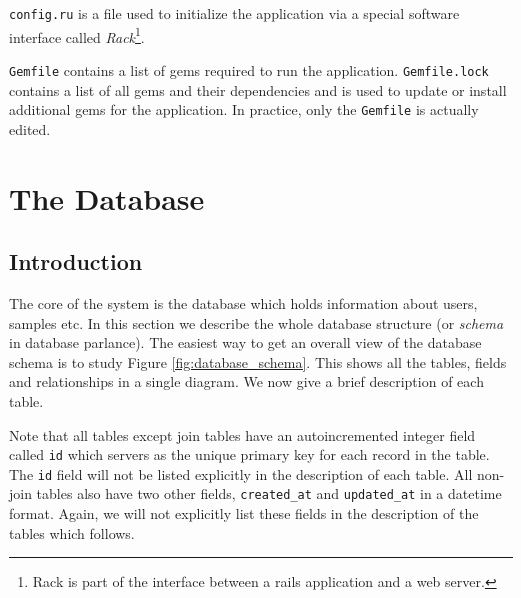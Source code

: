 \documentclass[12pt,twoside]{article}
\begin{document}
\verb=config.ru= is a file used to initialize the application via a
special software interface called \emph{Rack}\footnote{Rack is part
of the interface between a rails application and a web server.}.

\verb=Gemfile= contains a list of gems required to run the application.
\verb=Gemfile.lock= contains a list of all gems and their dependencies
and is used to update or install additional gems for the application.
In practice, only the \verb=Gemfile= is actually edited.

\section{The Database}\label{sec:database}
\subsection{Introduction}
The core of the system is the database which holds information about 
users, samples etc. In this section we describe the whole database
structure (or \emph{schema} in database parlance).
The easiest way to get an overall view of the database schema is to
study Figure \ref{fig:database_schema}. This shows
all the tables, fields and relationships in a single diagram.
We now give a brief description of each table.

Note that all tables except join tables have an autoincremented integer field
called \verb=id= which servers as the unique primary key for each record
in the table. The \verb=id= field will not be listed explicitly in the
description of each table. All non-join tables also have two other
fields, \verb=created_at= and \verb=updated_at= in a datetime format.
Again, we will not explicitly list these fields in the description
of the tables which follows.
\end{document}

